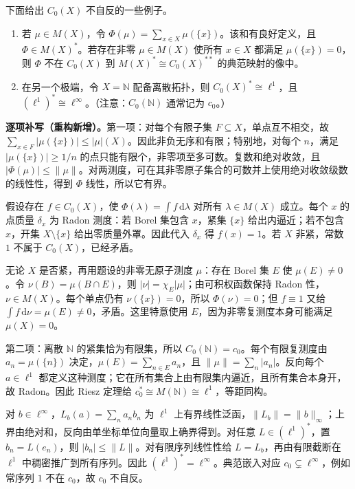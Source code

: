 \documentclass[../../main.tex]{subfiles}
\begin{document}
\begin{exercise}\label{exercise:ch07-czero-nonreflexive}
下面给出 $C_0(X)$ 不自反的一些例子。
\begin{enumerate}
\item\label{item:ch07-atom-sum-functional} 若 $\mu\in M(X)$，令 $\Phi(\mu)=\sum_{x\in X}\mu(\{x\})$。该和有良好定义，且 $\Phi\in M(X)^*$。若存在非零 $\mu\in M(X)$ 使所有 $x\in X$ 都满足 $\mu(\{x\})=0$，则 $\Phi$ 不在 $C_0(X)$ 到 $M(X)^*\cong C_0(X)^{**}$ 的典范映射的像中。
\item\label{item:ch07-discrete-czero-dual} 在另一个极端，令 $X=\mathbb N$ 配备离散拓扑，则 $C_0(X)^*\cong\ell^1$，且 $(\ell^1)^*\cong\ell^\infty$。（注意：$C_0(\mathbb N)$ 通常记为 $c_0$。）
\end{enumerate}
\end{exercise}
\begin{solution}
\textbf{逐项补写（重构新增）。}第一项：对每个有限子集 $F\subseteq X$，单点互不相交，故 $\sum_{x\in F}|\mu(\{x\})|\leqslant|\mu|(X)$。因此非负无序和有限；特别地，对每个 $n$，满足 $|\mu(\{x\})|\geqslant1/n$ 的点只能有限个，非零项至多可数。复数和绝对收敛，且 $|\Phi(\mu)|\leqslant\|\mu\|$。对两测度，可在其非零原子集合的可数并上使用绝对收敛级数的线性性，得到 $\Phi$ 线性，所以它有界。

假设存在 $f\in C_0(X)$，使 $\Phi(\lambda)=\int f\,\mathrm d\lambda$ 对所有 $\lambda\in M(X)$ 成立。每个 $x$ 的点质量 $\delta_x$ 为 Radon 测度：若 Borel 集包含 $x$，紧集 $\{x\}$ 给出内逼近；若不包含 $x$，开集 $X\setminus\{x\}$ 给出零质量外罩。因此代入 $\delta_x$ 得 $f(x)=1$。若 $X$ 非紧，常数 $1$ 不属于 $C_0(X)$，已经矛盾。

无论 $X$ 是否紧，再用题设的非零无原子测度 $\mu$：存在 Borel 集 $E$ 使 $\mu(E)\ne0$。令 $\nu(B)=\mu(B\cap E)$，则 $|\nu|=\chi_E|\mu|$；由可积权函数保持 Radon 性，$\nu\in M(X)$。每个单点仍有 $\nu(\{x\})=0$，所以 $\Phi(\nu)=0$；但 $f\equiv1$ 又给 $\int f\,\mathrm d\nu=\mu(E)\ne0$，矛盾。这里特意使用 $E$，因为非零复测度本身可能满足 $\mu(X)=0$。

第二项：离散 $\mathbb N$ 的紧集恰为有限集，所以 $C_0(\mathbb N)=c_0$。每个有限复测度由 $a_n=\mu(\{n\})$ 决定，$\mu(E)=\sum_{n\in E}a_n$，且 $\|\mu\|=\sum_n|a_n|$。反向每个 $a\in\ell^1$ 都定义这种测度；它在所有集合上由有限集内逼近，且所有集合本身开，故 Radon。因此 Riesz 定理给 $c_0^*\cong M(\mathbb N)\cong\ell^1$，等距同构。

对 $b\in\ell^\infty$，$L_b(a)=\sum_na_nb_n$ 为 $\ell^1$ 上有界线性泛函，$\|L_b\|=\|b\|_\infty$；上界由绝对和，反向由单坐标单位向量取上确界得到。对任意 $L\in(\ell^1)^*$，置 $b_n=L(e_n)$，则 $|b_n|\leqslant\|L\|$。对有限序列线性性给 $L=L_b$，再由有限截断在 $\ell^1$ 中稠密推广到所有序列。因此 $(\ell^1)^*=\ell^\infty$。典范嵌入对应 $c_0\subsetneq\ell^\infty$，例如常序列 $1$ 不在 $c_0$，故 $c_0$ 不自反。
\end{solution}
\end{document}
